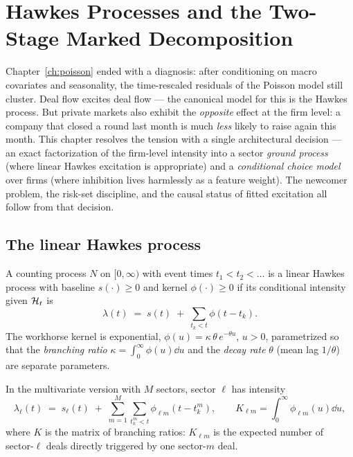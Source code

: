 \chapter{Hawkes Processes and the Two-Stage Marked Decomposition}
\label{ch:hawkes}

Chapter~\ref{ch:poisson} ended with a diagnosis: after conditioning on macro covariates
and seasonality, the time-rescaled residuals of the Poisson model still cluster. Deal flow
excites deal flow --- the canonical model for this is the Hawkes process. But private
markets also exhibit the \emph{opposite} effect at the firm level: a company that closed a
round last month is much \emph{less} likely to raise again this month. This chapter
resolves the tension with a single architectural decision --- an exact factorization of
the firm-level intensity into a sector \emph{ground process} (where linear Hawkes
excitation is appropriate) and a \emph{conditional choice model} over firms (where
inhibition lives harmlessly as a feature weight). The newcomer problem, the risk-set
discipline, and the causal status of fitted excitation all follow from that decision.

\section{The linear Hawkes process}
\label{sec:hw-linear}

\begin{definition}
\label{def:hw-hawkes}
A counting process $N$ on $[0,\infty)$ with event times $t_1 < t_2 < \dots$ is a linear
Hawkes process with baseline $s(\cdot) \ge 0$ and kernel $\phi(\cdot) \ge 0$ if its
conditional intensity given $\mathcal{H}_t$ is
\begin{equation}
\label{eq:hw-intensity}
\lambda(t) \;=\; s(t) \;+\; \sum_{t_k < t} \phi(t - t_k).
\end{equation}
The workhorse kernel is exponential, $\phi(u) = \kappa\,\theta\, e^{-\theta u}$, $u>0$,
parametrized so that the \emph{branching ratio}
$\kappa = \int_0^\infty \phi(u)\dd u$ and the \emph{decay rate} $\theta$ (mean lag
$1/\theta$) are separate parameters.
\end{definition}

In the multivariate version with $M$ sectors, sector $\ell$ has intensity
\begin{equation}
\label{eq:hw-multi}
\lambda_\ell(t) \;=\; s_\ell(t) \;+\; \sum_{m=1}^{M} \sum_{t^m_k < t}
\phi_{\ell m}(t - t^m_k),
\qquad
K_{\ell m} = \int_0^\infty \phi_{\ell m}(u) \dd u ,
\end{equation}
where $K$ is the matrix of branching ratios: $K_{\ell m}$ is the expected number of
sector-$\ell$ deals directly triggered by one sector-$m$ deal.

